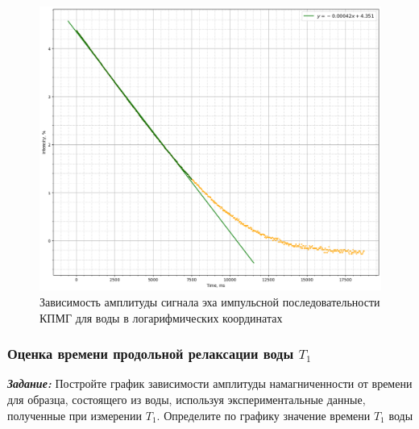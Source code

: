 \documentclass{article}
\begin{document}
\begin{itemize}
\begin{figure}[h!]
    \centering
    \includegraphics[scale = 0.4]{graphs/cmpg_h2o_log.png}
    \caption{Зависимость амплитуды сигнала эха импульсной последовательности КПМГ для воды в логарифмических координатах}
    \label{h2o_log}
\end{figure}


\end{itemize}


\subsubsection{Оценка времени продольной релаксации воды $T_1$} \label{t1}
\textbf{\textit{Задание:}} Постройте график зависимости амплитуды намагниченности от времени для образца, состоящего из воды, используя экспериментальные данные, полученные при измерении $T_1$. Определите по графику значение времени $T_1$ воды
\\ \par
\end{document}
